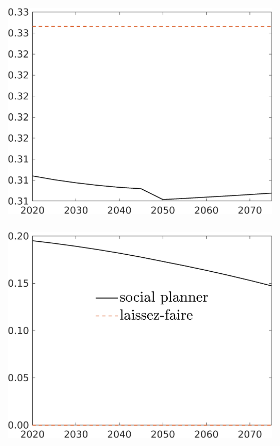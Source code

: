 \begin{figure}[h!!]
\begin{subfigure}{1\textwidth}
\begin{subfigure}[]{0.32\textwidth}
	\end{subfigure}	
	\begin{subfigure}[]{0.32\textwidth}
		\includegraphics[width=1\textwidth]{../../codding_model/own_basedOnFried/optimalPol_010922_revision/figures/all_13Sept22_Tplus30/hl_LFCompSP_T_regime4_knspil0_spillover0_noskill0_sep0_xgrowth0_PV1_etaa0.79_lgd0.png}
	\end{subfigure}
	\begin{subfigure}[]{0.32\textwidth}
	\includegraphics[width=1\textwidth]{../../codding_model/own_basedOnFried/optimalPol_010922_revision/figures/all_13Sept22_Tplus30/sff_LFCompSP_T_regime4_knspil0_spillover0_noskill0_sep0_xgrowth0_PV1_etaa0.79_lgd1.png}

\end{subfigure}
\end{subfigure}
\end{figure}
